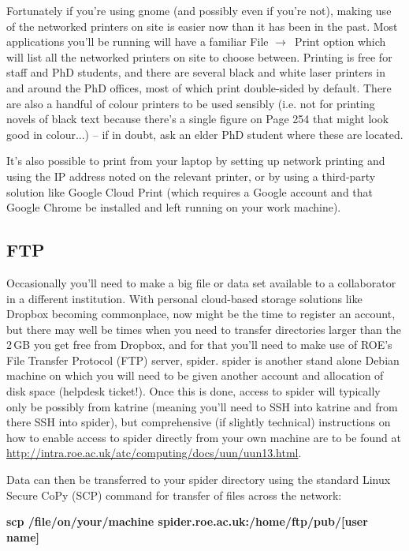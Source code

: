 Fortunately if you're using {\sc gnome} (and possibly even if you're not), making use of the networked printers on site is easier now than it has been in the past. Most applications you'll be running will have a familiar File $\rightarrow$\ Print option which will list all the networked printers on site to choose between. Printing is free for staff and PhD students, and there are several black and white laser printers in and around the PhD offices, most of which print double-sided by default. There are also a handful of colour printers to be used sensibly (i.e. not for printing novels of black text because there's a single figure on Page 254 that might look good in colour...) -- if in doubt, ask an elder PhD student where these are located.

It's also possible to print from your laptop by setting up network printing and using the IP address noted on the relevant printer, or by using a third-party solution like Google Cloud Print (which requires a Google account and that Google Chrome be installed and left running on your work machine).

\subsection{FTP}

Occasionally you'll need to make a big file or data set available to a collaborator in a different institution. With personal cloud-based storage solutions like Dropbox becoming commonplace, now might be the time to register an account, but there may well be times when you need to transfer directories larger than the 2\,GB you get free from Dropbox, and for that you'll need to make use of ROE's File Transfer Protocol (FTP) server, {\sc spider}. {\sc spider} is another stand alone Debian machine on which you will need to be given another account and allocation of disk space (helpdesk ticket!). Once this is done, access to {\sc spider} will typically only be possibly from {\sc katrine} (meaning you'll need to SSH into {\sc katrine} and from there SSH into {\sc spider}), but comprehensive (if slightly technical) instructions on how to enable access to {\sc spider} directly from your own machine are to be found at \url{http://intra.roe.ac.uk/atc/computing/docs/uun/uun13.html}. 

Data can then be transferred to your {\sc spider} directory using the standard Linux Secure CoPy (SCP) command for transfer of files across the network:

{\bf scp /file/on/your/machine spider.roe.ac.uk:/home/ftp/pub/[user name]}

